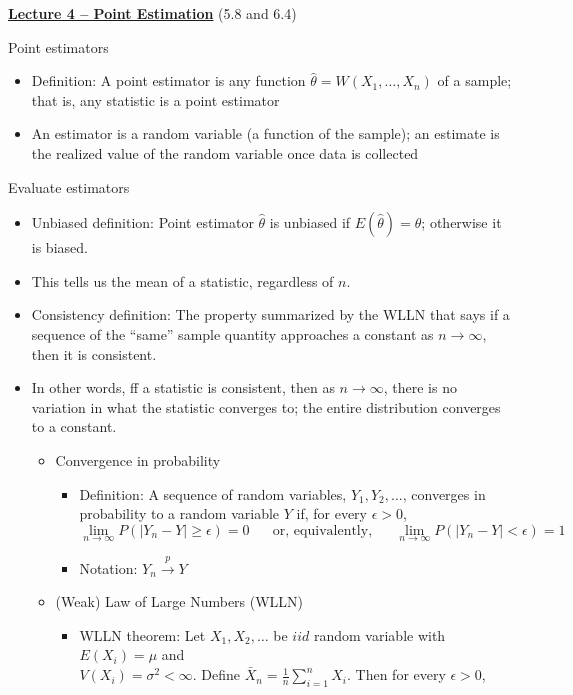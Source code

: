 \documentclass{article}
\newcommand{\bu}[1]{\textbf{\ul{#1}}}				%
\newcommand{\vecn}[2]{#1_1, \ldots, #1_{#2}}	%
\newcommand{\convp}[2]{#1 \overset{p} \to #2}		%
\begin{document}
\vspace{40pt}

{\large \bu{Lecture 4 -- Point Estimation}} (5.8 and 6.4)\bigskip

Point estimators
\begin{itemize}
    \item Definition: A point estimator is any function $\hat{\theta} = W(\vecn{X}{n})$ of a sample;\\ that is, any statistic is a point estimator
    \item An estimator is a random variable (a function of the sample); an estimate is the realized value of the random variable once data is collected
\end{itemize}\bigskip

Evaluate estimators
\begin{itemize}
    \item Unbiased definition: Point estimator $\hat{\theta}$ is unbiased if $E(\hat{\theta}) = \theta$; otherwise it is biased.
    \item[] This tells us the mean of a statistic, regardless of $n$.
    \item Consistency definition: The property summarized by the WLLN that says if a sequence of the ``same'' sample quantity approaches a constant as $n \to \infty$, then it is consistent.
    \item[] In other words, ff a statistic is consistent, then as $n \to \infty$, there is no variation in what the statistic converges to; the entire distribution converges to a constant.
    \begin{itemize}
        \item Convergence in probability
        \begin{itemize}
            \item Definition: A sequence of random variables, $Y_1, Y_2, \dots$, converges in probability to a random variable $Y$ if, for every $\epsilon > 0$,
            \[\lim_{n \to \infty} P(\lvert Y_n - Y \rvert \ge \epsilon) = 0 \hspace{20pt} \text{or, equivalently,} \hspace{20pt} \lim_{n \to \infty} P(\lvert Y_n - Y \rvert < \epsilon) = 1\]
            \item Notation: $\convp{Y_n}{Y}$
        \end{itemize}
        \item (Weak) Law of Large Numbers (WLLN)
        \begin{itemize}
            \item WLLN theorem: Let $X_1 ,X_2, \ldots$ be $iid$ random variable with $E(X_i) = \mu$ and \\ $V(X_i) = \sigma^2 < \infty$. Define $\displaystyle \bar{X}_n = \frac{1}{n} \sum_{i = 1}^n X_i$. Then for every $\epsilon > 0$,

\end{itemize}
\end{itemize}
\end{itemize}
\end{document}
